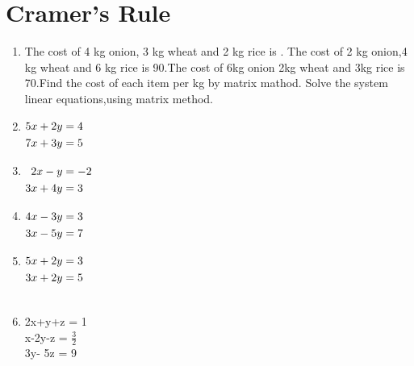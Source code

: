 \documentclass[journal,12pt,twocolumn]{IEEEtran}
\renewcommand\thesection{\arabic{section}}
\begin{document}
\section{Cramer's Rule}
\renewcommand{\theequation}{\theenumi}
\begin{enumerate}[label=\thesection.\arabic*.,ref=\thesection.\theenumi]
\item The cost of 4 kg onion, 3 kg wheat and 2 kg rice is . The cost of 2 kg onion,4 kg wheat and 6 kg rice is \rupee 90.The cost of 6kg onion 2kg wheat and 3kg rice is \rupee 70.Find the cost of each item per kg by matrix mathod. 
Solve the system linear equations,using matrix method.
\item 
$\begin{alignedat}[t]{2}
5x+2y&=4 \\ 7x+3y&=5
\end{alignedat}$
\\
\solution
%
\item 
$\begin{alignedat}[t]{2}
2x-y&=-2 \\ 3x+4y&=3
\end{alignedat}$
\\
\solution
%
\item $\begin{alignedat}[t]{2}
4x-3y&=3 \\ 3x-5y&=7
\end{alignedat}$
\\
\solution
%
\item $\begin{alignedat}[t]{2}
5x+2y&=3 \\ 3x+2y&=5
\end{alignedat}$\\
\\
\solution
%
\item 2x+y+z = 1 \\ x-2y-z = $\frac{3}{2}$ \\ 3y- 5z = 9\\

\end{enumerate}
\end{document}
